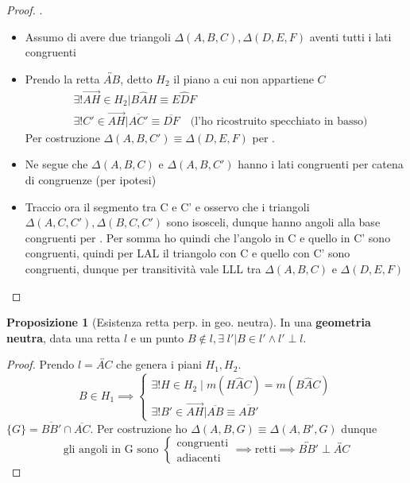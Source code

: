 \documentclass[a4paper,10pt]{article}
\theoremstyle{definition}
\theoremstyle{indentdefinition}
\theoremstyle{indentpostulate}
\theoremstyle{indenttheorem}
\newtheorem{prop}{Proposizione}[section]
\theoremstyle{myremark}
\theoremstyle{indentgeneral}
\newenvironment{myboxed} 
{\noindent\begin{lrbox}{\mybox}\begin{minipage}{\textwidth}}
{\end{minipage}\end{lrbox}\fbox{\usebox{\mybox}}}
\begin{document}
\begin{proof} .
\begin{itemize}
    \item Assumo di avere due triangoli $\Delta (A,B,C), \Delta(D,E,F)$ aventi tutti i lati congruenti 
    \item Prendo la retta $ \overleftrightarrow{AB}$, detto $H_2$ il piano a cui non appartiene $C$ \begin{align*}
        &\exists ! \overrightarrow{AH} \in H_2| B\hat{A}H \equiv E\hat{D}F \\
        &\exists ! C' \in \overrightarrow{AH}| \overline{AC'} \equiv \overline{DF} \quad \text{(l'ho ricostruito specchiato in basso)}
    \end{align*} Per costruzione $\Delta (A,B,C') \equiv \Delta (D,E,F)$ per . 
    \item Ne segue che $\Delta (A,B,C)$ e $\Delta (A,B,C')$ hanno i lati congruenti per catena di congruenze (per ipotesi)
    \item Traccio ora il segmento tra C e C' e osservo che i triangoli $\Delta (A,C,C'), \Delta (B,C,C')$ sono isosceli, dunque hanno angoli alla base congruenti per . Per somma ho quindi che l'angolo in C e quello in C' sono congruenti, quindi per LAL il triangolo con C e quello con C' sono congruenti, dunque per transitività vale LLL tra $\Delta (A,B,C)$ e $\Delta (D,E,F)$ 
\end{itemize}    \end{proof} 

\begin{myboxed}
\begin{prop}[Esistenza retta perp. in geo. neutra]   In una \textbf{geometria neutra}, data una retta $l$ e un punto $B \not \in l, \exists \;l'|B \in l' \land l' \perp l$.   \end{prop} 
\end{myboxed}

\begin{proof}     Prendo $l=\overleftrightarrow{AC}$ che genera i piani $H_1,H_2.$
$$B \in H_1\implies \begin{cases}
    \exists ! H \in H_2\mid  m(H\hat{A}C)=m(B\hat{A}C)\\
    \exists ! B' \in \overrightarrow{AH}|\overline{AB} \equiv \overline{AB'}
\end{cases}$$ $\{ G\}=\overline{BB'} \cap \overline{AC}.$ Per costruzione ho $\Delta (A,B,G) \equiv \Delta (A,B',G)$ dunque 
$$\text{gli angoli in G sono }\begin{cases}
    \text{congruenti}\\
    \text{adiacenti}
\end{cases}\implies \text{retti}\implies\overleftrightarrow{BB'} \perp \overleftrightarrow{AC}$$ 
\end{proof} 
\end{document}

